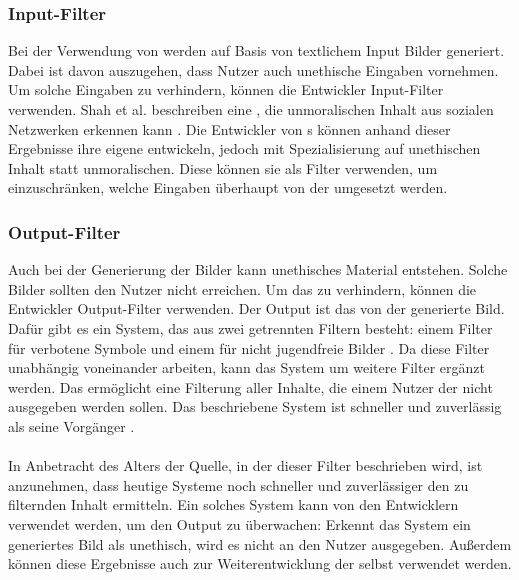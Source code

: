 \documentclass[hidelinks,12pt]{report}
\begin{document}
\subsubsection{Input-Filter}
Bei der Verwendung von  werden auf Basis von textlichem Input Bilder generiert. Dabei ist davon auszugehen, dass Nutzer auch unethische Eingaben vornehmen. Um solche Eingaben zu verhindern, können die Entwickler Input-Filter verwenden. Shah et al. beschreiben eine , die unmoralischen Inhalt aus sozialen Netzwerken erkennen kann \cite{Shah}. Die Entwickler von s können anhand dieser Ergebnisse ihre eigene  entwickeln, jedoch mit Spezialisierung auf unethischen Inhalt statt unmoralischen. Diese  können sie als Filter verwenden, um einzuschränken, welche Eingaben überhaupt von der  umgesetzt werden.
\\
\subsubsection{Output-Filter}
Auch bei der Generierung der Bilder kann unethisches Material entstehen. Solche Bilder sollten den Nutzer nicht erreichen. Um das zu verhindern, können die Entwickler Output-Filter verwenden. Der Output ist das von der  generierte Bild. Dafür gibt es ein System, das aus zwei getrennten Filtern besteht: einem Filter für verbotene Symbole und einem für nicht jugendfreie Bilder \cite{Zheng}. Da diese Filter unabhängig voneinander arbeiten, kann das System um weitere Filter ergänzt werden. Das ermöglicht eine Filterung aller Inhalte, die einem Nutzer der  nicht ausgegeben werden sollen. Das beschriebene System ist schneller und zuverlässig als seine Vorgänger \cite{Zheng}.
\\\\
In Anbetracht des Alters der Quelle, in der dieser Filter beschrieben wird, ist anzunehmen, dass heutige Systeme noch schneller und zuverlässiger den zu filternden Inhalt ermitteln. Ein solches System kann von den Entwicklern verwendet werden, um den Output zu überwachen: Erkennt das System ein generiertes Bild als unethisch, wird es nicht an den Nutzer ausgegeben. Außerdem können diese Ergebnisse auch zur Weiterentwicklung der  selbst verwendet werden.
\\
\end{document}
